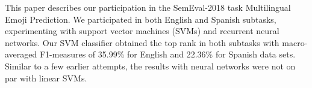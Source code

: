 This paper describes our participation in the SemEval-2018 task Multilingual Emoji Prediction. We participated in both English and Spanish subtasks, experimenting with support vector machines (SVMs) and recurrent neural networks.  Our SVM classifier obtained the top rank in both subtasks with macro-averaged F1-measures of 35.99\% for English and 22.36\% for Spanish data sets.  Similar to a few earlier attempts, the results with neural networks were not on par with linear SVMs.
